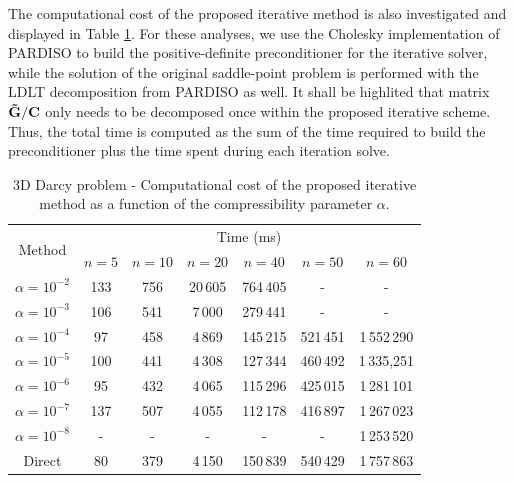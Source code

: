 \documentclass{wccm2024}
\begin{document}
The computational cost of the proposed iterative method is also investigated and displayed in Table \ref{tab:computational-cost}. For these analyses, we use the Cholesky implementation of PARDISO \cite{schenk2000efficient} to build the positive-definite preconditioner for the iterative solver, while the solution of the original saddle-point problem is performed with the LDLT decomposition from PARDISO as well. It shall be highlited that matrix $\mathbf{\Tilde{G}} / \mathbf{C}$ only needs to be decomposed once within the proposed iterative scheme. Thus, the total time is computed as the sum of the time required to build the preconditioner plus the time spent during each iteration solve.

\begin{table}[!htb]
    \centering
    \caption{3D Darcy problem - Computational cost of the proposed iterative method as a function of the compressibility parameter $\alpha$.}
    \begin{tabular}{ccccccc}
        \hline
        \multirow{2}{*}{Method} & \multicolumn{6}{c}{Time (ms)}                                \\ \cline{2-7} 
                                & $n=5$ & $n=10$ & $n=20$  & $n=40$   & $n=50$  & $n=60$      \\ \hline
        $\alpha=10^{-2}$        & 133   & 756    & 20\,605 & 764\,405 & -        & -           \\
        $\alpha=10^{-3}$        & 106   & 541    & 7\,000  & 279\,441 & -        & -           \\
        $\alpha=10^{-4}$        & 97    & 458    & 4\,869  & 145\,215 & 521\,451 & 1\,552\,290 \\
        $\alpha=10^{-5}$        & 100   & 441    & 4\,308  & 127\,344 & 460\,492 & 1\,335,251  \\
        $\alpha=10^{-6}$        & 95    & 432    & 4\,065  & 115\,296 & 425\,015 & 1\,281\,101 \\
        $\alpha=10^{-7}$        & 137   & 507    & 4\,055  & 112\,178 & 416\,897 & 1\,267\,023 \\
        $\alpha=10^{-8}$        & -     & -      & -       & -        & -        & 1\,253\,520 \\
        Direct                  & 80    & 379    & 4\,150  & 150\,839 & 540\,429 & 1\,757\,863 \\ \hline
    \end{tabular}
    \label{tab:computational-cost}
\end{table}
\end{document}
